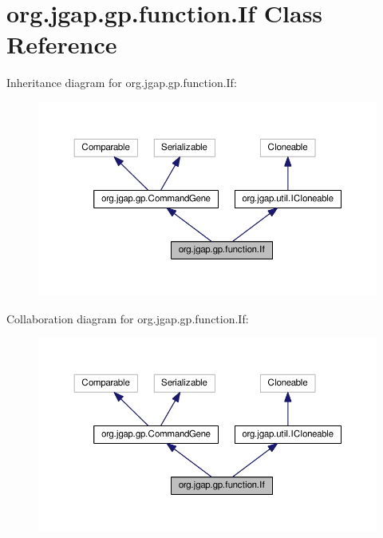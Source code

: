 \hypertarget{classorg_1_1jgap_1_1gp_1_1function_1_1_if}{\section{org.\-jgap.\-gp.\-function.\-If Class Reference}
\label{classorg_1_1jgap_1_1gp_1_1function_1_1_if}
}


Inheritance diagram for org.\-jgap.\-gp.\-function.\-If\-:
\nopagebreak
\begin{figure}[H]
\begin{center}
\leavevmode
\includegraphics[width=350pt]{classorg_1_1jgap_1_1gp_1_1function_1_1_if__inherit__graph}
\end{center}
\end{figure}


Collaboration diagram for org.\-jgap.\-gp.\-function.\-If\-:
\nopagebreak
\begin{figure}[H]
\begin{center}
\leavevmode
\includegraphics[width=350pt]{classorg_1_1jgap_1_1gp_1_1function_1_1_if__coll__graph}
\end{center}
\end{figure}
